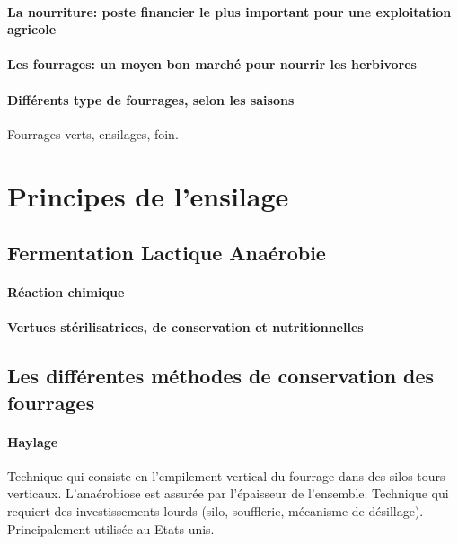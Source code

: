 \documentclass[12pt,a4paper]{report}
\begin{document}
\paragraph{La nourriture: poste financier le plus important pour une exploitation agricole}

\paragraph{Les fourrages: un moyen bon marché pour nourrir les herbivores}

\paragraph{Différents type de fourrages, selon les saisons}
Fourrages verts, ensilages, foin.




\section{Principes de l'ensilage}

\subsection{Fermentation Lactique Anaérobie}

\paragraph{Réaction chimique}

\paragraph{Vertues stérilisatrices, de conservation et nutritionnelles}

\subsection{Les différentes méthodes de conservation des fourrages}

\paragraph{Haylage} Technique qui consiste en l'empilement vertical du fourrage dans des silos-tours verticaux. L'anaérobiose est assurée par l'épaisseur de l'ensemble.
Technique qui requiert des investissements lourds (silo, soufflerie, mécanisme de désillage). Principalement utilisée au Etats-unis.
\end{document}
